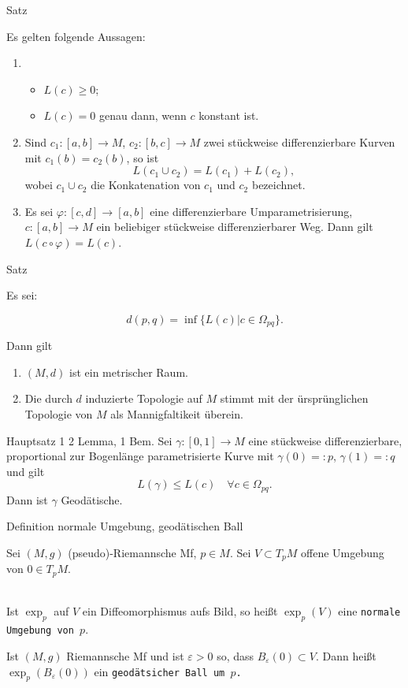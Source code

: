 \documentclass[a6paper,11pt,grid=front]{kartei}
\newcommand{\fl}[1]{\begin{flushleft}
 #1 \end{flushleft}}
\renewcommand{\epsilon}{\varepsilon}
\newcounter{satz}
\begin{document}
\nonameyet
{Satz} {}
{
	\small
\fl{Es gelten folgende Aussagen:}
\begin{enumerate}[1.]
\item 
\begin{itemize}
\item $L(c) \geq 0$; 
\item $L(c) = 0$ genau dann, wenn $c$ konstant ist.
\end{itemize}
%
\item Sind $c_1 : [a,b] \to M$, $c_2 : [b,c] \to  M$ zwei stückweise
differenzierbare Kurven mit $c_1(b) = c_2(b)$, so ist 
$$L(c_1 \cup c_2) = L(c_1) + L(c_2),$$ 
wobei $c_1 \cup c_2$ die Konkatenation von $c_1$ und $c_2$ bezeichnet.
\item Es sei $\varphi : [c,d] \to [a,b]$ eine differenzierbare 
Umparametrisierung, 
\\ $c : [a,b] \to M$ ein beliebiger stückweise 
differenzierbarer Weg.
Dann gilt  $L (c \circ \varphi) = L (c)$.
\end{enumerate}
}
{}

\nonameyet
{Satz} {}
{
\fl{Es sei:} 
\vspace{-1.1em}
\[
d(p,q) = \inf \{ L(c) | c \in \Omega_{pq} \}.
\]
\fl{Dann gilt}
\begin{enumerate}[1.]
\item $(M,d)$ ist ein metrischer Raum. 
\item Die durch $d$ induzierte Topologie auf $M$ stimmt mit der ürsprünglichen
Topologie von $M$ als Mannigfaltikeit überein.
\end{enumerate}
}
{}

\nonameyet
{Hauptsatz 1} {\scriptsize 2 Lemma, 1 Bem.}
{
Sei $\gamma : [0,1] \to M$ eine stückweise differenzierbare, proportional
zur Bogenlänge parametrisierte Kurve mit $\gamma(0) = :p$, $\gamma (1) = :q$
und gilt 
\[
L(\gamma)  \leq L(c) \quad \forall c \in \Omega_{pq}. 
\]
Dann ist $\gamma$ Geodätische.
}
{}

\nonameyet
{Definition} {\tiny normale Umgebung, geodätischen Ball}
{
\small
Sei $(M,g)$ (pseudo)-Riemannsche Mf, $p\in M$. 
Sei $V \subset T_p M$ offene Umgebung von $0 \in T_p M$.
\\
~\\
\fl{Ist $\exp_p$ auf $V$ ein
Diffeomorphismus aufs Bild, so heißt
$\exp_p(V)$ eine \texttt{normale Umgebung von $p$}.}
\fl{Ist $(M,g)$ Riemannsche Mf und ist $\epsilon > 0$ so, dass
$B_\epsilon(0) \subset V$. 
Dann heißt $\exp_p(B_\epsilon(0))$ ein \texttt{geodätsicher Ball um $p$.}}
}
{}
\end{document}
